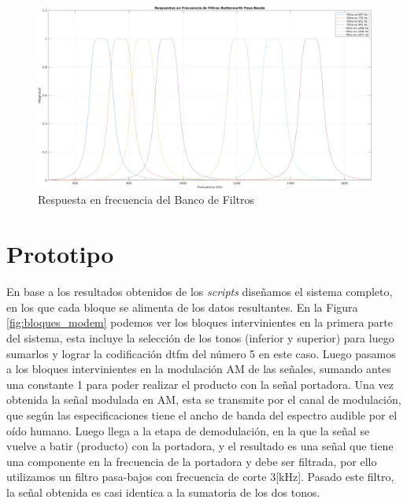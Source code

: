 \begin{figure}[H]
  
\end{figure}

\begin{figure}[H]
  \centering
  \includegraphics[width=\linewidth]{images/resp_frec_banco_filtros.png}
  \caption{Respuesta en frecuencia del Banco de Filtros}
  \label{fig:banco_filtros_resp_frec}
\end{figure}

\begin{figure}[H]
  
\end{figure}

\section{Prototipo}
En base a los resultados obtenidos de los \textit{scripts} diseñamos el sistema completo, en los que cada bloque se alimenta de los datos resultantes. En la Figura \ref{fig:bloques_modem} podemos ver los bloques intervinientes en la primera parte del sistema, esta incluye la selección de los tonos (inferior y superior) para luego sumarlos y lograr la codificación \gls{dtfm} del número 5 en este caso. Luego pasamos a los bloques intervinientes en la modulación AM de las señales, sumando antes una constante 1 para poder realizar el producto con la señal portadora. Una vez obtenida la señal modulada en AM, esta se transmite por el canal de modulación, que según las especificaciones tiene el ancho de banda del espectro audible por el oído humano. Luego llega a la etapa de demodulación, en la que la señal se vuelve a batir (producto) con la portadora, y el resultado es una señal que tiene una componente en la frecuencia de la portadora y debe ser filtrada, por ello utilizamos un filtro pasa-bajos con frecuencia de corte 3[kHz]. Pasado este filtro, la señal obtenida es casi identica a la sumatoria de los dos tonos.


